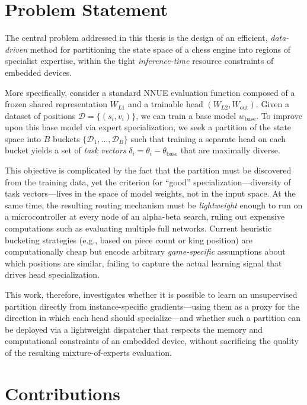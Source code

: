 \section{Problem Statement}\label{sec:problem-statement}

The central problem addressed in this thesis is the design of an efficient, \emph{data-driven} method for partitioning the state space of a chess engine into regions of specialist expertise, within the tight \emph{inference-time} resource constraints of embedded devices.

More specifically, consider a standard NNUE evaluation function composed of a frozen shared representation \(W_{L1}\) and a trainable head \((W_{L2}, W_{\mathrm{out}})\). Given a dataset of positions \(\mathcal{D} = \{(s_i, v_i)\}\), we can train a base model \(w_{\mathrm{base}}\). To improve upon this base model via expert specialization, we seek a partition of the state space into \(B\) buckets \(\{\mathcal{D}_1, \dots, \mathcal{D}_B\}\) such that training a separate head on each bucket yields a set of \emph{task vectors} \(\delta_i = \theta_i - \theta_{\mathrm{base}}\) that are maximally diverse.

This objective is complicated by the fact that the partition must be discovered from the training data, yet the criterion for ``good'' specialization---diversity of task vectors---lives in the space of model weights, not in the input space. At the same time, the resulting routing mechanism must be \emph{lightweight} enough to run on a microcontroller at every node of an alpha-beta search, ruling out expensive computations such as evaluating multiple full networks. Current heuristic bucketing strategies (e.g., based on piece count or king position) are computationally cheap but encode arbitrary \emph{game-specific} assumptions about which positions are similar, failing to capture the actual learning signal that drives head specialization.

This work, therefore, investigates whether it is possible to learn an unsupervised partition directly from instance-specific gradients---using them as a proxy for the direction in which each head should specialize---and whether such a partition can be deployed via a lightweight dispatcher that respects the memory and computational constraints of an embedded device, without sacrificing the quality of the resulting mixture-of-experts evaluation.

\section{Contributions}\label{sec:contributions}

